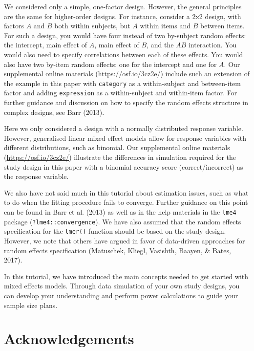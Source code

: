 \documentclass[
  english,
  doc,floatsintext]{apa6}
\begin{document}
We considered only a simple, one-factor design. However, the general principles are the same for higher-order designs. For instance, consider a 2x2 design, with factors \(A\) and \(B\) both within subjects, but \(A\) within items and \(B\) between items. For such a design, you would have four instead of two by-subject random effects: the intercept, main effect of \(A\), main effect of \(B\), and the \(AB\) interaction. You would also need to specify correlations between each of these effects. You would also have two by-item random effects: one for the intercept and one for \(A\). Our supplemental online materials (\url{https://osf.io/3cz2e/}) include such an extension of the example in this paper with \texttt{category} as a within-subject and between-item factor and adding \texttt{expression} as a within-subject and within-item factor. For further guidance and discussion on how to specify the random effects structure in complex designs, see Barr (2013).

Here we only considered a design with a normally distributed response variable. However, generalised linear mixed effect models allow for response variables with different distributions, such as binomial. Our supplemental online materials (\url{https://osf.io/3cz2e/}) illustrate the differences in simulation required for the study design in this paper with a binomial accuracy score (correct/incorrect) as the response variable.

We also have not said much in this tutorial about estimation issues, such as what to do when the fitting procedure fails to converge. Further guidance on this point can be found in Barr et al. (2013) as well as in the help materials in the \texttt{lme4} package (\texttt{?lme4::convergence}). We have also assumed that the random effects specification for the \texttt{lmer()} function should be based on the study design. However, we note that others have argued in favor of data-driven approaches for random effects specification (Matuschek, Kliegl, Vasishth, Baayen, \& Bates, 2017).

In this tutorial, we have introduced the main concepts needed to get started with mixed effects models. Through data simulation of your own study designs, you can develop your understanding and perform power calculations to guide your sample size plans.

\hypertarget{acknowledgements}{%
\section{Acknowledgements}\label{acknowledgements}}
\end{document}
